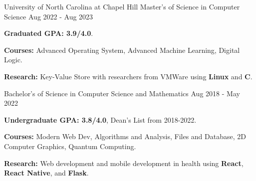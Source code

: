 \begin{cventries}
    \cvedentry
      {University of North Carolina at Chapel Hill} %
      {Master's of Science in Computer Science } %
      {Aug 2022 - Aug 2023}
      {
        \begin{cvitems} %
          \item {\textbf{Graduated GPA: 3.9/4.0}. }
          \item {\textbf{Courses:} Advanced Operating System, Advanced Machine Learning, Digital Logic.}
          \item {\textbf{Research:} Key-Value Store with researchers from VMWare using \textbf{Linux} and \textbf{C}.}
        \end{cvitems}
      }
      {Bachelor's of Science in Computer Science and Mathematics} %
      {Aug 2018 - May 2022} %
      {
        \begin{cvitems} %
          \item {\textbf{Undergraduate GPA: 3.8/4.0}, Dean's List from 2018-2022.}
          \item {\textbf{Courses:} Modern Web Dev, Algorithms and Analysis, Files and Database, 2D Computer Graphics, Quantum Computing.}
          \item {\textbf{Research:} Web development and mobile development in health using \textbf{React}, \textbf{React Native}, and \textbf{Flask}.}
        \end{cvitems}
      }
\end{cventries}
